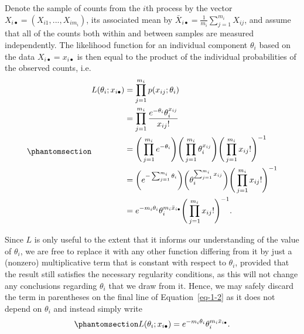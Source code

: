 \documentclass[
  12pt]{article}
\begin{document}
Denote the sample of counts from the \(i\)th process by the vector
\(X_{i\bullet} = (X_{i1}, ..., X_{im_i})\), its associated mean by
\(\bar{X}_{i \bullet} = \frac{1}{m_i} \sum_{j = 1}^{m_i} X_{ij}\), and
assume that all of the counts both within and between samples are
measured independently. The likelihood function for an individual
component \(\theta_i\) based on the data \(X_{i\bullet} = x_{i\bullet}\)
is then equal to the product of the individual probabilities of the
observed counts, i.e. \begin{equation}\phantomsection\label{eq-1-2}{
\begin{aligned}
L(\theta_i; x_{i\bullet}) &= \prod_{j=1}^{m_i} p(x_{ij}; \theta_i) \\
                          &= \prod_{j=1}^{m_i} \frac{e^{-\theta_i} \theta_i ^ {x_{ij}}}{x_{ij}!} \\
                          &= \Bigg(\prod_{j=1}^{m_i} e^{-\theta_i}\Bigg) \Bigg(\prod_{j=1}^{m_i}\theta_i^{x_{ij}}\Bigg) \Bigg(\prod_{j=1}^{m_i} x_{ij}!\Bigg)^{-1} \\
                          &= \bigg(e^{-\sum_{j=1}^{m_i}\theta_i}\bigg) \bigg(\theta_i^{\sum_{j=1}^{m_i}x_{ij}}\bigg) \Bigg(\prod_{j=1}^{m_i} x_{ij}!\Bigg)^{-1} \\
                          &= e^{-m_i\theta_i}\theta_i^{m_i\bar{x}_{i\bullet}}\Bigg(\prod_{j=1}^{m_i} x_{ij}!\Bigg)^{-1}.
\end{aligned}
}\end{equation}

Since \(L\) is only useful to the extent that it informs our
understanding of the value of \(\theta_i\), we are free to replace it
with any other function differing from it by just a (nonzero)
multiplicative term that is constant with respect to \(\theta_i\),
provided that the result still satisfies the necessary regularity
conditions, as this will not change any conclusions regarding
\(\theta_i\) that we draw from it. Hence, we may safely discard the term
in parentheses on the final line of Equation~\ref{eq-1-2} as it does not
depend on \(\theta_i\) and instead simply write
\begin{equation}\phantomsection\label{eq-1-3}{
L(\theta_i; x_{i\bullet}) = e^{-m_i\theta_i}\theta_i^{m_i\bar{x}_{i\bullet}}.
}\end{equation}
\end{document}
